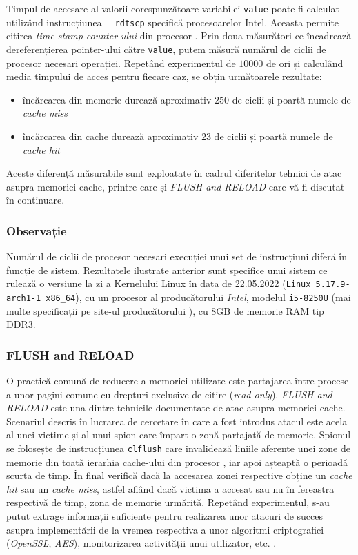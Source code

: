 Timpul de accesare al valorii corespunzătoare variabilei \texttt{value} poate
fi calculat utilizând instrucțiunea \texttt{\_\_rdtscp} specifică procesoarelor
Intel. Aceasta permite citirea \emph{time-stamp counter-ului} din procesor
\cite{rdtscp}. Prin doua măsurători ce încadrează dereferențierea pointer-ului
către \texttt{value}, putem măsură numărul de ciclii de procesor necesari
operației. Repetând experimentul de $10000$ de ori și calculând media
timpului de acces pentru fiecare caz, se obțin următoarele rezultate:

\begin{itemize}
  \setlength\itemsep{0em}
  \item încărcarea din memorie durează aproximativ $250$ de ciclii și poartă
    numele de \emph{cache miss}
  \item încărcarea din cache durează aproximativ $23$ de ciclii și poartă
    numele de \emph{cache hit}
\end{itemize}

Aceste diferență măsurabile sunt exploatate în cadrul diferitelor
tehnici de atac asupra memoriei cache, printre care și \emph{FLUSH and RELOAD}
care vă fi discutat în continuare.

\subsubsection{Observație}

Numărul de ciclii de procesor necesari execuției unui set de instrucțiuni
diferă în funcție de sistem. Rezultatele ilustrate anterior sunt specifice unui
sistem ce rulează o versiune la zi a Kernelului Linux în data de
22.05.2022 (\texttt{Linux 5.17.9-arch1-1 x86\_64}), cu un procesor al
producătorului \emph{Intel}, modelul \texttt{i5-8250U} (mai multe specificații
pe site-ul producătorului \cite{i5_8250U}), cu 8GB de memorie RAM tip DDR3.

\subsubsection{FLUSH and RELOAD}\label{sec:flush_reload}

O practică comună de reducere a memoriei utilizate este partajarea între
procese a unor pagini comune cu drepturi exclusive de citire
(\emph{read-only}). \emph{FLUSH and RELOAD} este una dintre tehnicile
documentate de atac asupra memoriei cache. Scenariul descris în lucrarea de
cercetare în care a fost introdus atacul este acela al unei victime și al unui
spion care împart o zonă partajată de memorie. Spionul se folosește de
instrucțiunea \texttt{clflush} care invalidează liniile aferente unei zone de
memorie din toată ierarhia cache-ului din procesor \cite{clflush}, iar apoi
așteaptă o perioadă scurta de timp. În final verifică dacă la accesarea zonei
respective obține un \emph{cache hit} sau un \emph{cache miss}, astfel aflând
dacă victima a accesat sau nu în fereastra respectivă de timp, zona de memorie
urmărită. Repetând experimentul, s-au putut extrage informații suficiente
pentru realizarea unor atacuri de succes asupra implementării de la vremea
respectiva a unor algoritmi criptografici (\emph{OpenSSL}, \emph{AES}),
monitorizarea activității unui utilizator, etc. \cite{flush_reload}.

